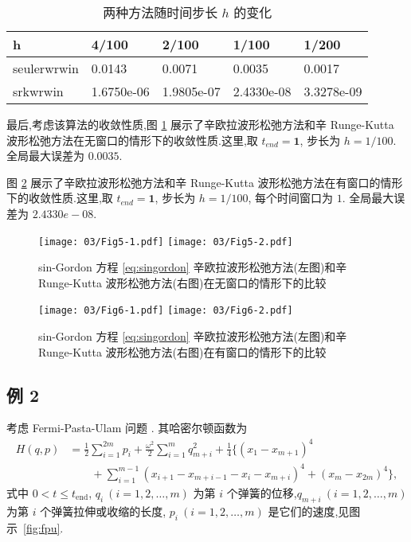 \begin{table}[h!]
    \begin{center}
    \caption{两种方法随时间步长 $h$ 的变化}
    \label{tbl:order}
    \begin{tabularx}{\linewidth}{XXXXX}
        \toprule[1.5pt]
        h & 4/100 & 2/100 & 1/100 & 1/200\\
        \midrule[1pt]
        seulerwrwin & 0.0143 &0.0071 &0.0035 &0.0017\\
        srkwrwin    & 1.6750e-06 & 1.9805e-07 & 2.4330e-08 & 3.3278e-09\\
        \bottomrule[1.5pt]
    \end{tabularx}
    \end{center}
  \end{table}

最后,考虑该算法的收敛性质,图 \ref{fig:ex1err} 展示了辛欧拉波形松弛方法和辛 Runge-Kutta 波形松弛方法在无窗口的情形下的收敛性质.这里,取 $t_{end} =\textbf{1}$, 步长为 $h=1/100$. 全局最大误差为 $0.0035$.

图 \ref{fig:ex1winerr} 展示了辛欧拉波形松弛方法和辛 Runge-Kutta 波形松弛方法在有窗口的情形下的收敛性质.这里,取 $t_{end} =\textbf{1}$, 步长为 $h=1/100$, 每个时间窗口为 $1$. 全局最大误差为 $2.4330e-08$.

\begin{figure}[h!]
  \centering
  \texttt{[image: 03/Fig5-1.pdf]}
  \texttt{[image: 03/Fig5-2.pdf]}
  \caption{sin-Gordon 方程 \eqref{eq:singordon} 辛欧拉波形松弛方法(左图)和辛 Runge-Kutta 波形松弛方法(右图)在无窗口的情形下的比较}
  \label{fig:ex1err}
\end{figure}

\begin{figure}[h!]
  \centering
  \texttt{[image: 03/Fig6-1.pdf]}
  \texttt{[image: 03/Fig6-2.pdf]}
  \caption{sin-Gordon 方程 \eqref{eq:singordon} 辛欧拉波形松弛方法(左图)和辛 Runge-Kutta 波形松弛方法(右图)在有窗口的情形下的比较}
  \label{fig:ex1winerr}
\end{figure}

\subsection*{例 2}
考虑 Fermi-Pasta-Ulam 问题 \cite{hairer2006geometric}. 其哈密尔顿函数为
\begin{equation*}
  \begin{aligned}
    H(q,p) &= \displaystyle{\frac{1}{2}} \sum_{i=1}^{2m} p_i +
    \displaystyle{\frac{\omega^2}{2}} \sum_{i=1}^{m} q_{m+i}^2 +
    \displaystyle{\frac{1}{4}}  \{ (x_1 - x_{m+1})^4 \\
    & \qquad + \sum_{i=1}^{m-1} (x_{i+1} - x_{m+i-1} - x_i - x_{m+i})^4 + (x_{m}
    - x_{2m})^4\},
  \end{aligned}
\end{equation*}
式中 $0<t\leq t_{\text{end}}$, $q_i~(i=1,2,\ldots,m)$ 为第 $i$ 个弹簧的位移,$q_{m+i}~(i=1,2,\ldots,m)$ 为第 $i$ 个弹簧拉伸或收缩的长度, $p_i~(i=1,2,\ldots,m)$ 是它们的速度,见图示~\ref{fig:fpu}.

